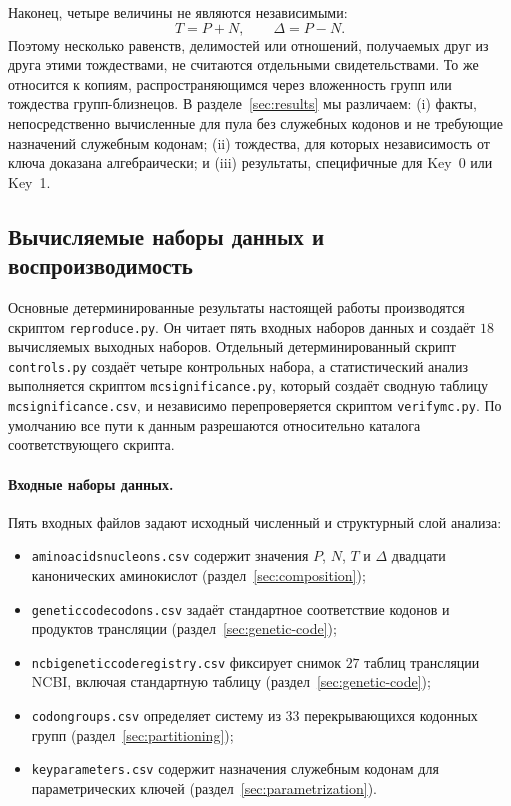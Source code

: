 \documentclass[11pt,a4paper]{article}
\renewcommand{\_}{\origunderscore\allowbreak}
\begin{document}
Наконец, четыре величины не являются независимыми:
\[
T=P+N,
\qquad
\Delta=P-N.
\]
Поэтому несколько равенств, делимостей или отношений, получаемых друг
из друга этими тождествами, не считаются отдельными свидетельствами.
То же относится к копиям, распространяющимся через вложенность групп
или тождества групп-близнецов. В разделе~\ref{sec:results} мы
различаем: (i) факты, непосредственно вычисленные для пула без
служебных кодонов и не требующие назначений служебным кодонам;
(ii) тождества,
для которых независимость от ключа доказана алгебраически; и
(iii) результаты, специфичные для Key~0 или Key~1.

\subsection{Вычисляемые наборы данных и воспроизводимость}
\label{sec:datasets}

\begingroup\sloppy

Основные детерминированные результаты настоящей работы производятся
скриптом \texttt{reproduce.py}. Он читает пять входных наборов данных
и создаёт $18$ вычисляемых выходных наборов. Отдельный
детерминированный скрипт \texttt{controls.py} создаёт четыре
контрольных набора, а статистический анализ выполняется скриптом
\texttt{mc\_significance.py}, который создаёт сводную таблицу
\texttt{mc\_significance.csv}, и независимо перепроверяется скриптом
\texttt{verify\_mc.py}. По умолчанию все пути к данным разрешаются
относительно каталога соответствующего скрипта.

\paragraph{Входные наборы данных.}
Пять входных файлов задают исходный численный и структурный слой
анализа:
\begin{itemize}
  \item \texttt{amino\_acids\_nucleons.csv} содержит значения
        $P$, $N$, $T$ и $\Delta$ двадцати канонических аминокислот
        (раздел~\ref{sec:composition});
  \item \texttt{genetic\_code\_codons.csv} задаёт стандартное
        соответствие кодонов и продуктов трансляции
        (раздел~\ref{sec:genetic-code});
  \item \texttt{ncbi\_genetic\_code\_registry.csv} фиксирует снимок
        $27$ таблиц трансляции NCBI, включая стандартную таблицу
        (раздел~\ref{sec:genetic-code});
  \item \texttt{codon\_groups.csv} определяет систему из $33$
        перекрывающихся кодонных групп
        (раздел~\ref{sec:partitioning});
  \item \texttt{key\_parameters.csv} содержит назначения служебным
        кодонам для параметрических ключей
        (раздел~\ref{sec:parametrization}).
\end{itemize}
\end{document}
